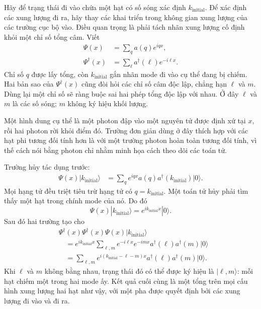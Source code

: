 Hãy để trạng thái đi vào chứa một hạt có số sóng xác định \(k_{\mathrm{initial}}\). Để xác định các xung lượng đi ra, hãy thay các khai triển trong không gian xung lượng của các trường cục bộ vào. Điều quan trọng là phải tách nhãn xung lượng cố định khỏi một chỉ số tổng câm. Viết
\begin{align}
\Psi(x)&=\sum_q a(q)e^{iqx},\\
\Psi^\dagger(x)&=\sum_\ell a^\dagger(\ell)e^{-i\ell x}.
\end{align}
Chỉ số \(q\) được lấy tổng, còn \(k_{\mathrm{initial}}\) gắn nhãn mode đi vào cụ thể đang bị chiếm. Hai bản sao của \(\Psi^\dagger(x)\) cũng đòi hỏi các chỉ số câm độc lập, chẳng hạn \(\ell\) và \(m\). Dùng lại một chỉ số sẽ ràng buộc sai hai phép tổng độc lập với nhau. Ở đây \(\ell\) và \(m\) là các số sóng; \(m\) không ký hiệu khối lượng.

Một hình dung cụ thể là một photon đập vào một nguyên tử được định xứ tại \(x\), rồi hai photon rời khỏi điểm đó. Trường đơn giản dùng ở đây thích hợp với các hạt phi tương đối tính hơn là với một trường photon hoàn toàn tương đối tính, vì thế cách nói bằng photon chỉ nhằm minh họa cách theo dõi các toán tử.

Trường hủy tác dụng trước:
\begin{align}
\Psi(x)|k_{\mathrm{initial}}\rangle
&=\sum_q e^{iqx}a(q)a^\dagger(k_{\mathrm{initial}})|0\rangle.
\end{align}
Mọi hạng tử đều triệt tiêu trừ hạng tử có \(q=k_{\mathrm{initial}}\). Một toán tử hủy phải tìm thấy một hạt trong chính mode của nó. Do đó
\begin{equation}
\Psi(x)|k_{\mathrm{initial}}\rangle
=e^{ik_{\mathrm{initial}}x}|0\rangle.
\end{equation}
Sau đó hai trường tạo cho
\begin{align}
&\Psi^\dagger(x)\Psi^\dagger(x)\Psi(x)
|k_{\mathrm{initial}}\rangle
\\
&\quad=
e^{ik_{\mathrm{initial}}x}
\sum_{\ell,m}
e^{-i\ell x}e^{-imx}
a^\dagger(\ell)a^\dagger(m)|0\rangle
\\
&\quad=
\sum_{\ell,m}
e^{i(k_{\mathrm{initial}}-\ell-m)x}
a^\dagger(\ell)a^\dagger(m)|0\rangle.
\end{align}
Khi \(\ell\) và \(m\) không bằng nhau, trạng thái đó có thể được ký hiệu là \(|\ell,m\rangle\): mỗi hạt chiếm một trong hai mode ấy. Kết quả cuối cùng là một tổng trên mọi cấu hình xung lượng hai hạt như vậy, với một pha được quyết định bởi các xung lượng đi vào và đi ra.


